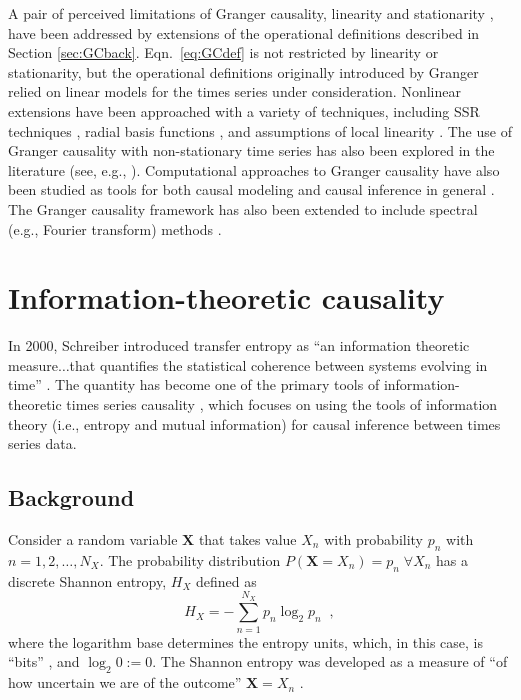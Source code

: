 A pair of perceived limitations of Granger causality, linearity and stationarity \cite{He2001}, have been addressed by extensions of the operational definitions described in Section \ref{sec:GCback}.  Eqn.\ \ref{eq:GCdef} is not restricted by linearity or stationarity, but the operational definitions originally introduced by Granger relied on linear models for the times series under consideration.  Nonlinear extensions have been approached with a variety of techniques, including SSR techniques \cite{Chen2004}, radial basis functions \cite{Ancona2004}, and assumptions of local linearity \cite{Freiwald1999}.   The use of Granger causality with non-stationary time series has also been explored in the literature (see, e.g., \cite{Hesse2003,Kaminski2001,Barnett2015}).  Computational approaches to Granger causality have also been studied as tools for both causal modeling \cite{Arnold2007} and causal inference in general \cite{Shojaie2010,Lozano2009}.  The Granger causality framework has also been extended to include spectral (e.g., Fourier transform) methods \cite{Dhamala2008}.

\section{Information-theoretic causality}
\label{sec:TE}
In 2000, Schreiber introduced transfer entropy as ``an information theoretic measure$\ldots$that quantifies the statistical coherence between systems evolving in time'' \cite{Schreiber2000}.  The quantity has become one of the primary tools of information-theoretic times series causality \cite{Schindler2007,Kaiser2002}, which focuses on using the tools of information theory (i.e., entropy and mutual information) for causal inference between times series data.  

\subsection{Background}
Consider a random variable $\mathbf{X}$ that takes value $X_n$ with probability $p_n$ with $n = 1,2,\ldots,N_X$.  The probability distribution $P(\mathbf{X}=X_n) = p_n\;\forall X_n$ has a discrete Shannon entropy, $H_X$ defined as
\begin{equation}
H_X = -\sum_{n=1}^{N_X} p_n \log_2 p_n\;\;,
\end{equation}
where the logarithm base determines the entropy units, which, in this case, is ``bits'' \cite{Shannon1948,Schreiber2000,Schindler2007,Kaiser2002}, and $\log_2 0:= 0$.  The Shannon entropy was developed as a measure of ``of how uncertain we are of the outcome'' $\mathbf{X}=X_n$ \cite{Shannon1948}.

